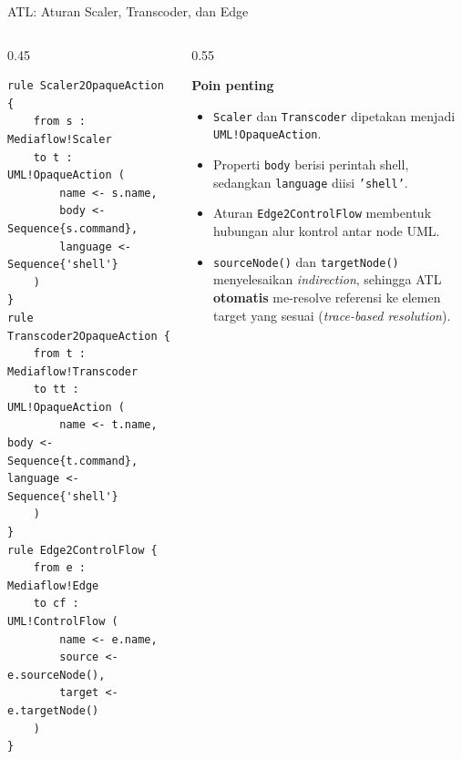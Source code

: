 \documentclass[aspectratio=169, table]{beamer}
\begin{document}
\begin{frame}[fragile]{ATL: Aturan Scaler, Transcoder, dan Edge}
\vspace{14pt}
\begin{columns}[T]
    \begin{column}{0.45\textwidth}
\begin{lstlisting}[language=atl, basicstyle=\ttfamily\tiny]
rule Scaler2OpaqueAction {
    from s : Mediaflow!Scaler
    to t : UML!OpaqueAction (
        name <- s.name,
        body <- Sequence{s.command},
        language <- Sequence{'shell'}
    )
}
rule Transcoder2OpaqueAction {
    from t : Mediaflow!Transcoder
    to tt : UML!OpaqueAction (
        name <- t.name,  body <- Sequence{t.command},  language <- Sequence{'shell'}
    )
}
rule Edge2ControlFlow {
    from e : Mediaflow!Edge
    to cf : UML!ControlFlow (
        name <- e.name,
        source <- e.sourceNode(),
        target <- e.targetNode()
    )
}
\end{lstlisting}
    \end{column}

    \begin{column}{0.55\textwidth}

    \textbf{Poin penting}

    \begin{itemize}
        \item \texttt{Scaler} dan \texttt{Transcoder}
        dipetakan menjadi
        \texttt{UML!OpaqueAction}.
        
        \item Properti \texttt{body} berisi
        perintah shell, sedangkan
        \texttt{language} diisi
        \texttt{'shell'}.
        
        \item Aturan \texttt{Edge2ControlFlow}
        membentuk hubungan alur kontrol
        antar node UML.
        
        \item \texttt{sourceNode()} dan
        \texttt{targetNode()} menyelesaikan
        \textit{indirection}, sehingga ATL
        \textbf{otomatis} me-resolve referensi
        ke elemen target yang sesuai
        (\textit{trace-based resolution}).
    \end{itemize}
    \end{column}
\end{columns}
\end{frame}

\end{document}
